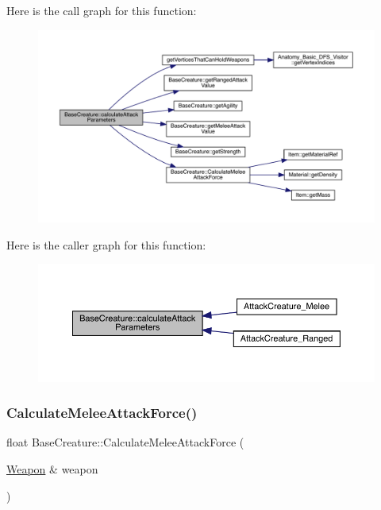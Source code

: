 Here is the call graph for this function\+:
\nopagebreak
\begin{figure}[H]
\begin{center}
\leavevmode
\includegraphics[width=350pt]{class_base_creature_a389d8ae4c4caa2d7c55939bef70935a8_cgraph}
\end{center}
\end{figure}
Here is the caller graph for this function\+:
\nopagebreak
\begin{figure}[H]
\begin{center}
\leavevmode
\includegraphics[width=350pt]{class_base_creature_a389d8ae4c4caa2d7c55939bef70935a8_icgraph}
\end{center}
\end{figure}
\mbox{\label{class_base_creature_ac81e681e444ed860c212463025d04a1d}} 
\subsubsection{\texorpdfstring{Calculate\+Melee\+Attack\+Force()}{CalculateMeleeAttackForce()}}
{\footnotesize\ttfamily float Base\+Creature\+::\+Calculate\+Melee\+Attack\+Force (\begin{DoxyParamCaption}\item[{\mbox{\hyperlink{class_weapon}{Weapon}} \&}]{weapon }\end{DoxyParamCaption})}

